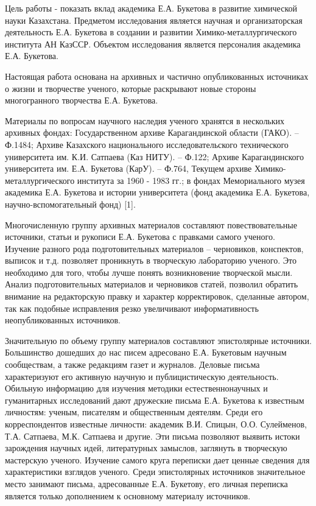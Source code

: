 Цель работы - показать вклад академика Е.А. Букетова в развитие
химической науки Казахстана. Предметом исследования является научная и
организаторская деятельность Е.А. Букетова в создании и развитии
Химико-металлургического института АН КазССР. Объектом исследования
является персоналия академика Е.А. Букетова.

Настоящая работа основана на архивных и частично опубликованных
источниках о жизни и творчестве ученого, которые раскрывают новые
стороны многогранного творчества Е.А. Букетова.

Материалы по вопросам научного наследия ученого хранятся в нескольких
архивных фондах: Государственном архиве Карагандинской области (ГАКО).
-- Ф.1484; Архиве Казахского национального исследовательского
технического университета им. К.И. Сатпаева (Каз НИТУ). -- Ф.122; Архиве
Карагандинского университета им. Е.А. Букетова (КарУ). -- Ф.764, Текущем
архиве Химико-металлургического института за 1960 - 1983 гг.; в фондах
Мемориального музея академика Е.А. Букетова и истории университета (фонд
академика Е.А. Букетова, научно-вспомогательный фонд) {[}1{]}.

Многочисленную группу архивных материалов составляют повествовательные
источники, статьи и рукописи Е.А. Букетова с правками самого ученого.
Изучение разного рода подготовительных материалов -- черновиков,
конспектов, выписок и т.д. позволяет проникнуть в творческую лабораторию
ученого. Это необходимо для того, чтобы лучше понять возникновение
творческой мысли. Анализ подготовительных материалов и черновиков
статей, позволил обратить внимание на редакторскую правку и характер
корректировок, сделанные автором, так как подобные исправления резко
увеличивают информативность неопубликованных источников.

Значительную по объему группу материалов составляют эпистолярные
источники. Большинство дошедших до нас писем адресовано Е.А. Букетовым
научным сообществам, а также редакциям газет и журналов. Деловые письма
характеризуют его активную научную и публицистическую деятельность.
Обильную информацию для изучения методики естественнонаучных и
гуманитарных исследований дают дружеские письма Е.А. Букетова к
известным личностям: ученым, писателям и общественным деятелям. Среди
его корреспондентов известные личности: академик В.И. Спицын, О.О.
Сулейменов, Т.А. Сатпаева, М.К. Сатпаева и другие. Эти письма позволяют
выявить истоки зарождения научных идей, литературных замыслов, заглянуть
в творческую мастерскую ученого. Изучение самого круга переписки дает
ценные сведения для характеристики взглядов ученого. Среди эпистолярных
источников значительное место занимают письма, адресованные Е.А.
Букетову, его личная переписка является только дополнением к основному
материалу источников.


